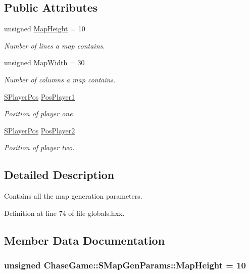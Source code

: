 \subsection*{Public Attributes}
\begin{DoxyCompactItemize}
\item 
unsigned \hyperlink{struct_chase_game_1_1_s_map_gen_params_a772c51dab66176dfe733e4e20cbf85d4}{Map\-Height} = 10
\begin{DoxyCompactList}\small\item\em Number of lines a map contains. \end{DoxyCompactList}\item 
unsigned \hyperlink{struct_chase_game_1_1_s_map_gen_params_a0897aeaa1a1a3a66697a6b441ca8c2de}{Map\-Width} = 30
\begin{DoxyCompactList}\small\item\em Number of columns a map contains. \end{DoxyCompactList}\item 
\hyperlink{struct_chase_game_1_1_s_player_pos}{S\-Player\-Pos} \hyperlink{struct_chase_game_1_1_s_map_gen_params_a8db28a9ee45a200d67b20fc803645501}{Pos\-Player1}
\begin{DoxyCompactList}\small\item\em Position of player one. \end{DoxyCompactList}\item 
\hyperlink{struct_chase_game_1_1_s_player_pos}{S\-Player\-Pos} \hyperlink{struct_chase_game_1_1_s_map_gen_params_afd0a0d4b22e228d547af88d38b6ae963}{Pos\-Player2}
\begin{DoxyCompactList}\small\item\em Position of player two. \end{DoxyCompactList}\end{DoxyCompactItemize}


\subsection{Detailed Description}
Contains all the map generation parameters. 

Definition at line 74 of file globals.\-hxx.



\subsection{Member Data Documentation}
\hypertarget{struct_chase_game_1_1_s_map_gen_params_a772c51dab66176dfe733e4e20cbf85d4}{
\subsubsection[{Map\-Height}]{\setlength{\rightskip}{0pt plus 5cm}unsigned Chase\-Game\-::\-S\-Map\-Gen\-Params\-::\-Map\-Height = 10}}\label{struct_chase_game_1_1_s_map_gen_params_a772c51dab66176dfe733e4e20cbf85d4}


